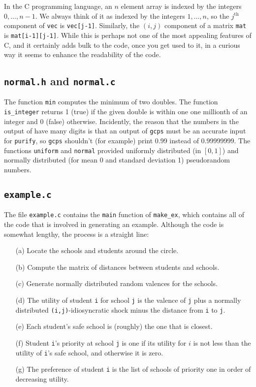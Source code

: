 \documentclass[12pt]{article}
\theoremstyle{definition}
\begin{document}
\begin{appendix}
In the C programming language, an $n$ element array is indexed by the
integers $0, \ldots, n-1$.  We always think of it as indexed by the
integers $1, \ldots, n$, so the $j^{\text{th}}$ component of
\texttt{vec} is \texttt{vec[j-1]}.  Similarly, the $(i,j)$ component
of a matrix \texttt{mat} is \texttt{mat[i-1][j-1]}.  While this is
perhaps not one of the most appealing features of C, and it certainly
adds bulk to the code, once you get used to it, in a curious way it
seems to enhance the readability of the code.

\subsection{\texttt{normal.h} and \texttt{normal.c}}

The function \texttt{min} computes the minimum of two doubles.  The
function \texttt{is\_integer} returns 1 (true) if the given double is
within one one millionth of an integer and 0 (false) otherwise.
Incidently, the reason that the numbers in the output of 
have many digits is that an output of \texttt{gcps} must be an
accurate input for \texttt{purify}, so \texttt{gcps} shouldn't (for
example) print 0.99 instead of 0.99999999. The functions
\texttt{uniform} and \texttt{normal} provided uniformly distributed
(in $[0,1]$) and normally distributed (for mean 0 and standard
deviation 1) pseudorandom numbers.

\subsection{\texttt{example.c}}

The file \texttt{example.c} contains the \texttt{main} function of
\texttt{make\_ex}, which contains all of the code that is involved in
generating an example.  Although the code is somewhat lengthy, the
process is a straight line:
\begin{enumerate}
  \item[(a)] Locate the schools and students around the circle.
  \item[(b)] Compute the matrix of distances between students and schools.
  \item[(c)] Generate normally distributed random valences for the schools.
  \item[(d)] The utility of student \texttt{i} for school \texttt{j}
    is the valence of \texttt{j} plus a normally distributed
    \texttt{(i,j)}-idiosyncratic shock minus the distance from
    \texttt{i} to \texttt{j}.
  \item[(e)] Each student's safe school is (roughly) the one that is closest.
  \item[(f)] Student \texttt{i}'s priority at school \texttt{j} is one
    if its utility for $i$ is not less than the utility of
    \texttt{i}'s safe school, and otherwise it is zero.
  \item[(g)] The preference of student \texttt{i} is the list of
    schools of priority one in order of decreasing utility.
\end{enumerate}


\end{appendix}
\end{document}
